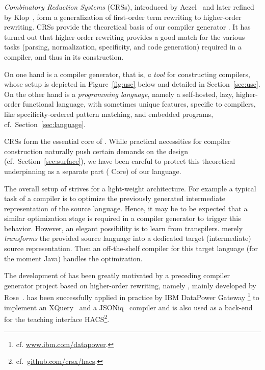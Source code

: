 
\emph{Combinatory Reduction Systems} (CRSs), introduced by
Aczel~\cite{Aczel:78} and later refined by Klop~\cite{1980_klop}, form
a generalization of first-order term rewriting to higher-order
rewriting.  CRSs provide the theoretical basis of our compiler
generator \Tosca. It has turned out that higher-order rewriting
provides a good match for the various tasks (parsing, normalization,
specificity, and code generation) required in a compiler, and thus in
its construction.

On one hand \Tosca is a compiler generator, that is, \emph{a tool} for
constructing compilers, whose setup is depicted in
Figure~\ref{fig:use} below and detailed in Section~\ref{sec:use}. On
the other hand \Tosca is a \emph{programming language}, namely a
self-hosted, lazy, higher-order functional language, with sometimes
unique features, specific to compilers, like specificity-ordered
pattern matching, and embedded programs,
cf.~Section~\ref{sec:language}.

CRSs form the essential core of \Tosca. While practical
necessities for compiler construction naturally push certain demands
on the design (cf.~Section~\ref{sec:surface}), we have been careful to
protect this theoretical underpinning as a separate part (\Tosca
Core) of our language.

The overall setup of \Tosca strives for a light-weight
architecture. For example a typical task of a compiler is to optimize
the previously generated intermediate representation of the source
language. Hence, it may be to be expected that a similar optimization
stage is required in a compiler generator to trigger this
behavior. However, an elegant possibility is to learn from
transpilers. \Tosca merely \emph{transforms} the provided source
language \PL into a dedicated target (intermediate) source
representation.  Then an off-the-shelf compiler for this target
language (for the moment Java) handles the optimization.

The development of \Tosca has been greatly motivated by a preceding
compiler generator project based on higher-order rewriting, namely
\crsx, mainly developed by Rose~\cite{2010_rose,2011_rose}. \crsx has
been successfully applied in practice by IBM DataPower Gateway%
\footnote{cf. \href{http://www.ibm.com/datapower}{www.ibm.com/datapower}.}
to implement an XQuery~\cite{Walmsley:07} and a JSONiq~\cite{FF:13}
compiler and is also used as a back-end for the teaching interface
HACS\footnote{cf.~\href{https://github.com/crsx/hacs}{github.com/crsx/hacs}.}.\cite{gentle_hacs}

